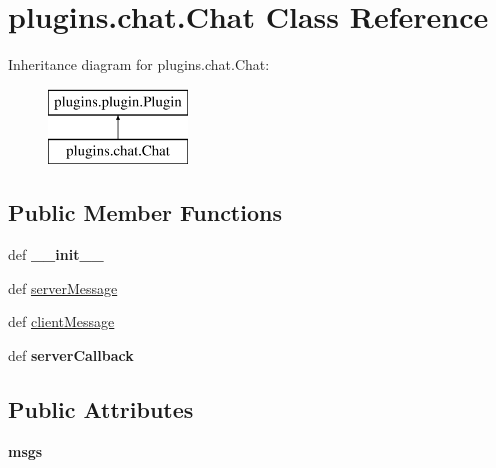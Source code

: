 \hypertarget{classplugins_1_1chat_1_1_chat}{\section{plugins.\-chat.\-Chat \-Class \-Reference}
\label{classplugins_1_1chat_1_1_chat}
}
\-Inheritance diagram for plugins.\-chat.\-Chat\-:\begin{figure}[H]
\begin{center}
\leavevmode
\includegraphics[height=2.000000cm]{classplugins_1_1chat_1_1_chat}
\end{center}
\end{figure}
\subsection*{\-Public \-Member \-Functions}
\begin{DoxyCompactItemize}
\item 
\hypertarget{classplugins_1_1chat_1_1_chat_ae62256183dbaeded5984584f1f324ab6}{def {\bfseries \-\_\-\-\_\-init\-\_\-\-\_\-}}\label{classplugins_1_1chat_1_1_chat_ae62256183dbaeded5984584f1f324ab6}

\item 
def \hyperlink{classplugins_1_1chat_1_1_chat_af8546a2537aee9bf99e09007649e2320}{server\-Message}
\item 
def \hyperlink{classplugins_1_1chat_1_1_chat_ad241689aeb8b03c689248ffb18584d40}{client\-Message}
\item 
\hypertarget{classplugins_1_1chat_1_1_chat_a6273e3684a31e428d06ab115b1813bfd}{def {\bfseries server\-Callback}}\label{classplugins_1_1chat_1_1_chat_a6273e3684a31e428d06ab115b1813bfd}

\end{DoxyCompactItemize}
\subsection*{\-Public \-Attributes}
\begin{DoxyCompactItemize}
\item 
\hypertarget{classplugins_1_1chat_1_1_chat_a4082230dd09dc360fa943d7a491bc0b8}{{\bfseries msgs}}\label{classplugins_1_1chat_1_1_chat_a4082230dd09dc360fa943d7a491bc0b8}

\end{DoxyCompactItemize}
